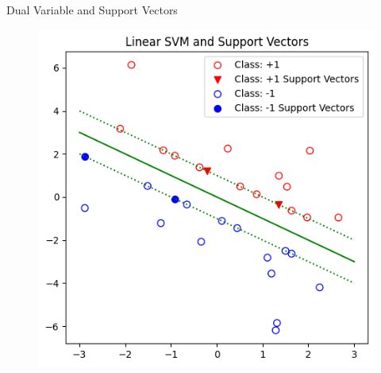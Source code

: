\documentclass[11pt,compress,t,notes=noshow, xcolor=table]{beamer}
\begin{document}
\begin{vbframe}{Dual Variable and Support Vectors}
\begin{minipage}[t]{0.4\columnwidth}
\begin{figure}
      \includegraphics[width=\columnwidth]{figure/linear_svm_support_vectors_2.png}
    \end{figure}
  \end{minipage}
\end{vbframe}

\endlecture
\end{document}
